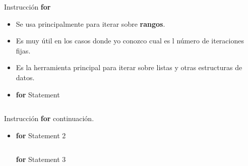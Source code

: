 \documentclass[usenames, dvipsnames, compress]{beamer}
\begin{document}
	\begin{frame}{Instrucción \textbf{for}}
	\begin{itemize}
		\item Se usa principalmente para iterar sobre \textbf{rangos}.
		\pause
		\item Es muy útil en los casos donde yo conozco cual es l número de iteraciones fijas.
		\pause
		\item Es la herramienta principal para iterar sobre listas y otras estructuras de datos.
		\pause
		\item [] \begin{block}{\textbf{for} Statement}
			\inputminted[xleftmargin=\parindent,linenos]{python}{codes/for_statement.m}
		\end{block}
	\end{itemize}
	\end{frame}
	\begin{frame}[allowframebreaks]{Instrucción \textbf{for} continuación.}
	\begin{itemize}
	\item [] \begin{block}{\textbf{for} Statement 2}
		\inputminted[xleftmargin=\parindent,linenos]{python}{codes/for_statement2.m}
	\end{block}
		\begin{block}{\textbf{for} Statement 3}
		\inputminted[xleftmargin=\parindent,linenos]{python}{codes/for_statement3.m}
	\end{block}
	\end{itemize}
	\end{frame}
\end{document}
